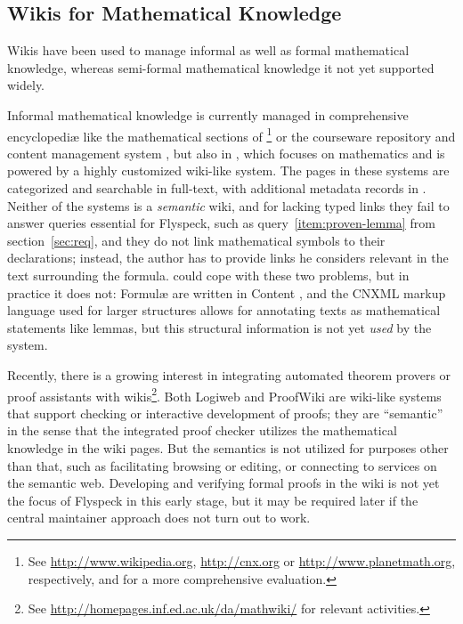 \subsection{Wikis for Mathematical Knowledge}
\label{sec:math-wiki}

Wikis have been used to manage informal as well as formal mathematical knowledge, whereas
semi-formal mathematical knowledge it not yet supported widely.

Informal mathematical knowledge is currently managed in comprehensive encyclopediæ like
the mathematical sections of \footnote{See
  \url{http://www.wikipedia.org}, \url{http://cnx.org} or \url{http://www.planetmath.org},
  respectively, and\cite{Lange:swmkm-tr07} for a more comprehensive evaluation.} or the
courseware repository and content management system
\footnotemark[\value{footnote}], but also in
\footnotemark[\value{footnote}], which focuses on mathematics and is
powered by a highly customized wiki-like system.  The pages in these systems are
categorized and searchable in full-text, with additional metadata records in
.  Neither of the systems is a \emph{semantic} wiki, and for lacking
typed links they fail to answer queries essential for Flyspeck, such as
query~\ref{item:proven-lemma} from section~\ref{sec:req}, and they do not link
mathematical symbols to their declarations; instead, the author has to provide links he
considers relevant in the text surrounding the formula.   could cope
with these two problems, but in practice it does not: Formulæ are written in Content
{\mathml}\cite{CarlisleEd:MathML07}, and the CNXML markup language used for larger
structures allows for annotating texts as mathematical statements like
lemmas\cite{connexions05:cnxml}, but this structural information is not yet \emph{used}
by the system.

Recently, there is a growing interest in integrating automated theorem provers or proof
assistants with wikis\footnote{See \url{http://homepages.inf.ed.ac.uk/da/mathwiki/} for
  relevant activities.}.  Both Logiweb and ProofWiki are wiki-like systems that support
checking or interactive development of proofs; they are ``semantic'' in the sense that the
integrated proof checker utilizes the mathematical knowledge in the wiki pages.  But the
semantics is not utilized for purposes other than that, such as facilitating browsing or
editing, or connecting to services on the semantic web.  Developing and verifying formal
proofs in the wiki is not yet the focus of Flyspeck in this early stage, but it may be
required later if the central maintainer approach does not turn out to
work.

